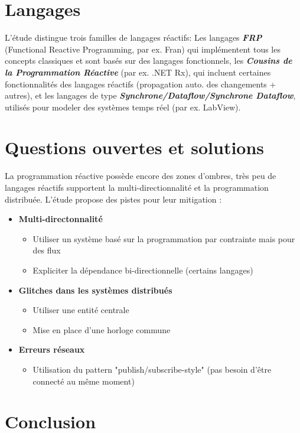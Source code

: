 \documentclass[10pt,final]{IEEEtran}
\begin{document}
\section{Langages}

L'étude distingue trois familles de langages réactifs: Les langages \textit{\textbf{FRP}} (Functional Reactive Programming, par ex. Fran) qui implémentent tous les concepts classiques et sont basés sur des langages fonctionnels, les \textit{\textbf{Cousins de la Programmation Réactive}} (par ex. .NET Rx), qui incluent certaines fonctionnalités des langages réactifs (propagation auto. des changements + autres), et les langages de type \textit{\textbf{Synchrone/Dataflow/Synchrone Dataflow}}, utilisés pour modeler des systèmes temps réel (par ex. LabView).

\section{Questions ouvertes et solutions}

La programmation réactive possède encore des zones d'ombres, très peu de langages réactifs
supportent la multi-directionnalité et la programmation distribuée. L'étude propose des pistes pour leur mitigation :
\begin{itemize}
    \item \textbf{Multi-directonnalité}
        \begin{itemize}
            \item Utiliser un système basé sur la programmation par contrainte mais pour des flux
            \item Expliciter la dépendance bi-directionnelle (certains langages)
        \end{itemize}
    \item \textbf{Glitches dans les systèmes distribués}
        \begin{itemize}
            \item Utiliser une entité centrale
            \item Mise en place d'une horloge commune
        \end{itemize}
    \item \textbf{Erreurs réseaux}
        \begin{itemize}
            \item Utilisation du pattern "publish/subscribe-style" (pas besoin d'être connecté au même moment)
        \end{itemize}
\end{itemize}

\section{Conclusion}
\end{document}

